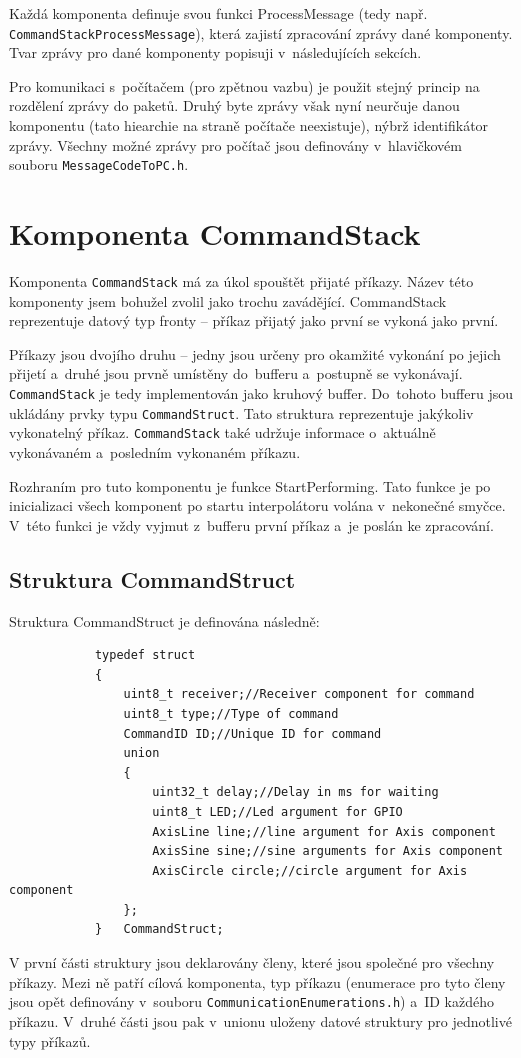 		Každá komponenta definuje svou funkci ProcessMessage (tedy např. \texttt{CommandStackProcessMessage}), která zajistí zpracování zprávy dané komponenty. Tvar zprávy pro dané komponenty popisuji v~následujících sekcích.
		
		Pro komunikaci s~počítačem (pro zpětnou vazbu) je použit stejný princip na rozdělení zprávy do paketů. Druhý byte zprávy však nyní neurčuje danou komponentu (tato hiearchie na straně počítače neexistuje), nýbrž identifikátor zprávy. Všechny možné zprávy pro počítač jsou definovány v~hlavičkovém souboru {\tt MessageCodeToPC.h}.
		
	\section{Komponenta CommandStack}
	
	Komponenta {\tt CommandStack} má za úkol spouštět přijaté příkazy. Název této komponenty jsem bohužel zvolil jako trochu zavádějící. CommandStack reprezentuje datový typ fronty -- příkaz přijatý jako první se vykoná jako první.
	
	Příkazy jsou dvojího druhu -- jedny jsou určeny pro okamžité vykonání po jejich přijetí a~druhé jsou prvně umístěny do~bufferu a~postupně se vykonávají. {\tt CommandStack} je tedy implementován jako kruhový buffer. Do~tohoto bufferu jsou ukládány prvky typu {\tt CommandStruct}. Tato struktura reprezentuje jakýkoliv vykonatelný příkaz. {\tt CommandStack} také udržuje informace o~aktuálně vykonávaném a~posledním vykonaném příkazu.
	
	Rozhraním pro tuto komponentu je funkce StartPerforming. Tato funkce je po inicializaci všech komponent po startu interpolátoru volána v~nekonečné smyčce. V~této funkci je vždy vyjmut z~bufferu první příkaz a~je poslán ke zpracování.
	
		\subsection{Struktura CommandStruct}
		Struktura CommandStruct je definována následně:
		\begin{verbatim}
			typedef struct
			{
			    uint8_t receiver;//Receiver component for command
			    uint8_t type;//Type of command
			    CommandID ID;//Unique ID for command
			    union
			    {
			        uint32_t delay;//Delay in ms for waiting
			        uint8_t LED;//Led argument for GPIO
			        AxisLine line;//line argument for Axis component
			        AxisSine sine;//sine arguments for Axis component
			        AxisCircle circle;//circle argument for Axis component
			    };
			}	CommandStruct;
		\end{verbatim}
		V první části struktury jsou deklarovány členy, které jsou společné pro všechny příkazy. Mezi ně patří cílová komponenta, typ příkazu (enumerace pro tyto členy jsou opět definovány v~souboru {\tt CommunicationEnumerations.h}) a~ID každého příkazu. V~druhé části jsou pak v~unionu uloženy datové struktury pro jednotlivé typy příkazů.
		
